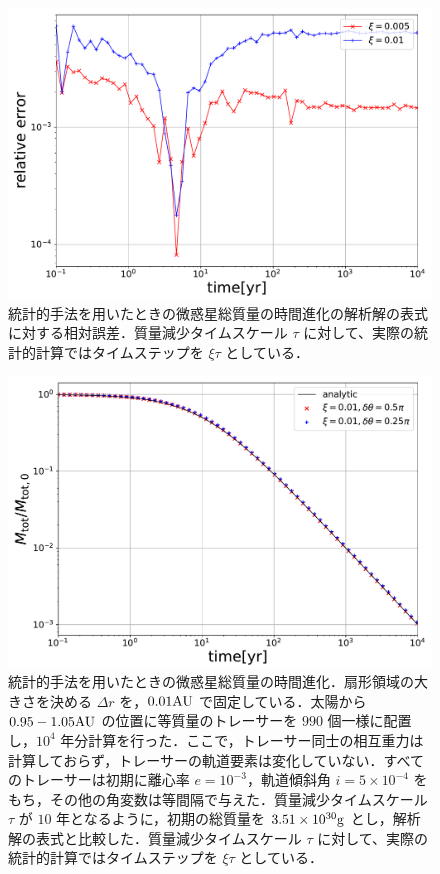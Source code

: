 \documentclass[11pt,a4paper,oneside,onecolumn]{jreport}
\begin{document}
\begin{figure}[H]
 \centering
 \includegraphics[width=12cm]{./image/MassDepletion_relative_error.pdf}
 \caption{統計的手法を用いたときの微惑星総質量の時間進化の解析解の表式\cite{3}に対する相対誤差．質量減少タイムスケール $\tau$ に対して、実際の統計的計算ではタイムステップを $\xi \tau$ としている．\label{}}
\end{figure}



\begin{figure}[H]
 \centering
 \includegraphics[width=12cm]{./image/MassDepletion_05pi025pi.pdf}
 \caption{統計的手法を用いたときの微惑星総質量の時間進化．扇形領域の大きさを決める $\Delta r$ を，$0.01 {\rm AU}$ で固定している．太陽から $0.95 - 1.05 {\rm AU}$ の位置に等質量のトレーサーを $990$ 個一様に配置し，$10^4$ 年分計算を行った．ここで，トレーサー同士の相互重力は計算しておらず，トレーサーの軌道要素は変化していない．すべてのトレーサーは初期に離心率 $e = 10^{-3}$，軌道傾斜角 $i = 5 \times 10^{-4}$ をもち，その他の角変数は等間隔で与えた．質量減少タイムスケール $\tau$ が $10$ 年となるように，初期の総質量を $3.51 \times 10^{30} {\rm g}$ とし，解析解の表式\cite{3}と比較した．質量減少タイムスケール $\tau$ に対して、実際の統計的計算ではタイムステップを $\xi \tau$ としている．\label{}}
\end{figure}
\end{document}
